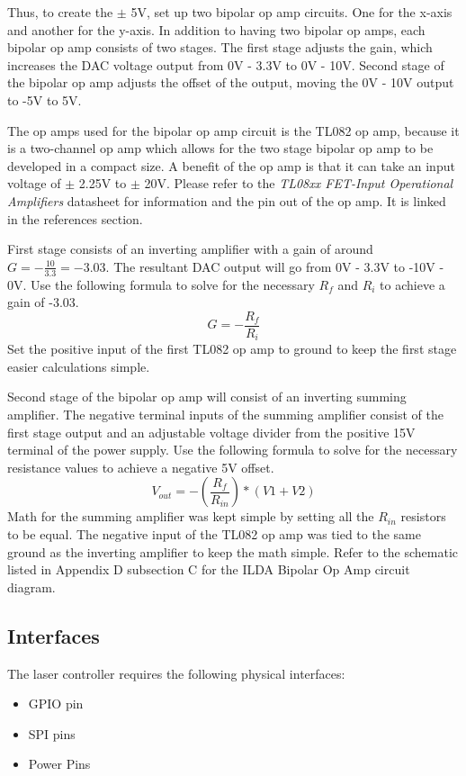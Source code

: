 \documentclass[journal]{IEEEtran}
\begin{document}
    Thus, to create the $\pm$ 5V, set up two bipolar op amp circuits.
    One for the x-axis and another for the y-axis.
    In addition to having two bipolar op amps, each bipolar op amp consists of two stages.
    The first stage adjusts the gain, which increases the DAC voltage output from 0V - 3.3V to 0V - 10V.
    Second stage of the bipolar op amp adjusts the offset of the output, moving the 0V - 10V output to -5V to 5V.

    The op amps used for the bipolar op amp circuit is the TL082 op amp, because it is a two-channel op amp which allows for the two stage bipolar op amp to be developed in a compact size.
    A benefit of the op amp is that it can take an input voltage of $\pm$ 2.25V to $\pm$ 20V.
    Please refer to the \emph{TL08xx FET-Input Operational Amplifiers} datasheet for information and the pin out of the op amp. It is linked in the references section.

    First stage consists of an inverting amplifier with a gain of around $G = - \frac{10}{3.3} = -3.03$.
    The resultant DAC output will go from 0V - 3.3V to -10V - 0V.
    Use the following formula to solve for the necessary $R_{f}$ and $R_{i}$ to achieve a gain of -3.03.
    $$ G = -\frac{R_{f}}{R_{i}}$$
    Set the positive input of the first TL082 op amp to ground to keep the first stage easier calculations simple.

    Second stage of the bipolar op amp will consist of an inverting summing amplifier.
    The negative terminal inputs of the summing amplifier consist of the first stage output and an adjustable voltage divider from the positive 15V terminal of the power supply.
    Use the following formula to solve for the necessary resistance values to achieve a negative 5V offset.
    $$ V_{out} = -(\frac{R_{f}}{R_{in}}) * (V1 + V2)$$ 
    Math for the summing amplifier was kept simple by setting all the $R_{in}$ resistors to be equal.
    The negative input of the TL082 op amp was tied to the same ground as the inverting amplifier to keep the math simple.
    Refer to the schematic listed in Appendix D subsection C for the ILDA Bipolar Op Amp circuit diagram.

    \subsection{Interfaces}
    The laser controller requires the following physical interfaces:
    \begin{itemize}
        \item GPIO pin
        \item SPI pins
        \item Power Pins
    \end{itemize}
\end{document}
